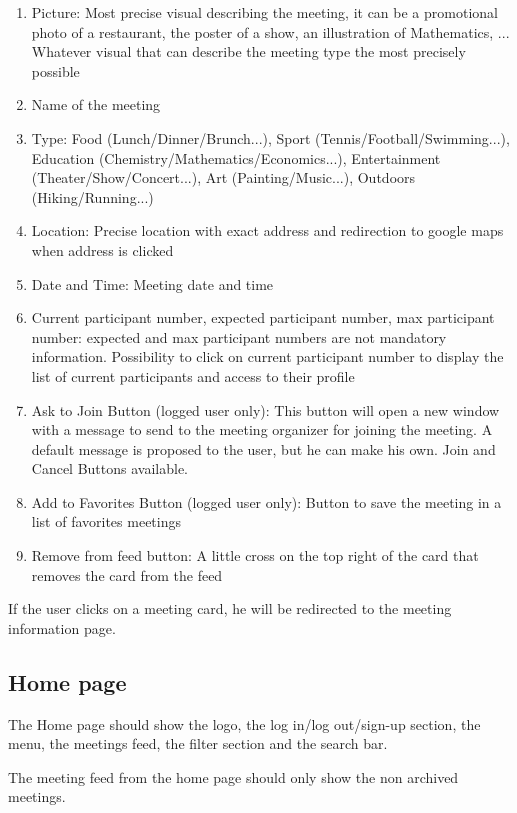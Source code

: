 \documentclass[conference]{IEEEtran}
\begin{document}
\begin{enumerate}
    \item Picture: Most precise visual describing the meeting, it can be a promotional photo of a restaurant, the poster of a show, an illustration of Mathematics, ... Whatever visual that can describe the meeting type the most precisely possible
    \item Name of the meeting
    \item Type: Food (Lunch/Dinner/Brunch...), Sport (Tennis/Football/Swimming...), Education (Chemistry/Mathematics/Economics...), Entertainment (Theater/Show/Concert...), Art (Painting/Music...), Outdoors (Hiking/Running...)
    \item Location: Precise location with exact address and redirection to google maps when address is clicked
    \item Date and Time: Meeting date and time
    \item Current participant number, expected participant number, max participant number: expected and max participant numbers are not mandatory information.
    Possibility to click on current participant number to display the list of current participants and access to their profile
    \item Ask to Join Button (logged user only): This button will open a new window with a message to send to the meeting organizer for joining the meeting.
    A default message is proposed to the user, but he can make his own.
    Join and Cancel Buttons available.
    \item Add to Favorites Button (logged user only): Button to save the meeting in a list of favorites meetings
    \item Remove from feed button: A little cross on the top right of the card that removes the card from the feed
\end{enumerate}

If the user clicks on a meeting card, he will be redirected to the meeting information page.

\subsection{Home page}

The Home page should show the logo, the log in/log out/sign-up section, the menu, the meetings feed, the filter section and the search bar.

The meeting feed from the home page should only show the non archived meetings.
\end{document}
